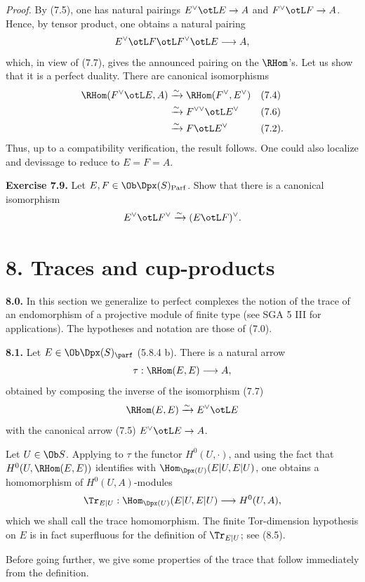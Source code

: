 \documentclass[11pt]{article}
\newcommand{\Parf}{\operatorname{Parf}}
\begin{document}
\emph{Proof.} By (7.5), one has natural pairings \(E^\vee\otL E\to A\) and \(F^\vee\otL F\to A\). Hence, by tensor product, one obtains a natural pairing
\[
  E^\vee\otL F\otL F^\vee\otL E\longrightarrow A,
\]
which, in view of (7.7), gives the announced pairing on the \(\RHom\)'s. Let us show that it is a perfect duality. There are canonical isomorphisms
\[
\begin{aligned}
\RHom(F^\vee\otL E,A)&\xrightarrow{\sim}\RHom(F^\vee,E^\vee) &&(7.4)\\
&\xrightarrow{\sim} F^{\vee\vee}\otL E^\vee &&(7.6)\\
&\xrightarrow{\sim} F\otL E^\vee &&(7.2).
\end{aligned}
\]
Thus, up to a compatibility verification, the result follows. One could also localize and devissage to reduce to \(E=F=A\).


\textbf{Exercise 7.9.} Let \(E,F\in\Ob\Dpx(S)_{\Parf}\). Show that there is a canonical isomorphism
\[
  E^\vee\otL F^\vee \xrightarrow{\sim} (E\otL F)^\vee .
\]

\section*{8. Traces and cup-products}

\textbf{8.0.} In this section we generalize to perfect complexes the notion of the trace of an endomorphism of a projective module of finite type (see SGA 5 III for applications). The hypotheses and notation are those of (7.0).

\textbf{8.1.} Let \(E\in\Ob\Dpx(S)_{\parf}\) (5.8.4 b). There is a natural arrow
\[
  \tau:\RHom(E,E)\longrightarrow A,
\]
obtained by composing the inverse of the isomorphism (7.7)
\[
  \RHom(E,E)\xrightarrow{\sim}E^\vee\otL E
\]
with the canonical arrow (7.5) \(E^\vee\otL E\to A\).

Let \(U\in\Ob S\). Applying to \(\tau\) the functor \(H^0(U,\cdot)\), and using the fact that \(H^0(U,\RHom(E,E))\) identifies with \(\Hom_{\Dpx(U)}(E|U,E|U)\), one obtains a homomorphism of \(H^0(U,A)\)-modules
\[
  \Tr_{E|U}:\Hom_{\Dpx(U)}(E|U,E|U)\longrightarrow H^0(U,A),
\]
which we shall call the trace homomorphism. The finite Tor-dimension hypothesis on \(E\) is in fact superfluous for the definition of \(\Tr_{E|U}\); see (8.5).

Before going further, we give some properties of the trace that follow immediately from the definition.
\end{document}
